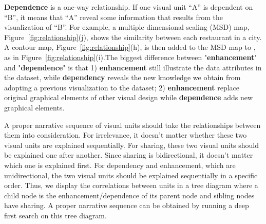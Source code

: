 \noindent
\textbf{Dependence} is a one-way relationship. If one visual unit ``A'' is dependent on ``B'', it means that ``A'' reveal some information that results from the visualization of ``B''. For example, a multiple dimensional scaling (MSD) map, Figure~\ref{fig:relationship}(j), shows the similarity between each restaurant in a city. A contour map, Figure~\ref{fig:relationship}(h), is then added to the MSD map to , as in Figure~\ref{fig:relationship}(i).The biggest difference between "\textbf{enhancement}" and "\textbf{dependence}" is that 1) \textbf{enhancement} still illustrate the data attributes in the dataset, while \textbf{dependency} reveals the new knowledge we obtain from adopting a previous visualization to the dataset; 2) \textbf{enhancement} replace original graphical elements of other visual design while \textbf{dependence} adds new graphical elements.

A proper narrative sequence of visual units should take the relationships between them into consideration. For irrelevance, it doesn't matter whether these two visual units are explained sequentially. For sharing, these two visual units should be explained one after another. Since sharing is bidirectional, it doesn't matter which one is explained first. For dependency and enhancement, which are unidirectional, the two visual units should be explained sequentially in a specific order. 
 Thus, we display the correlations between units in a tree diagram where a child node is the enhancement/dependence of its parent node and sibling nodes have sharing. A proper narrative sequence can be obtained by running a deep first search on this tree diagram. 





